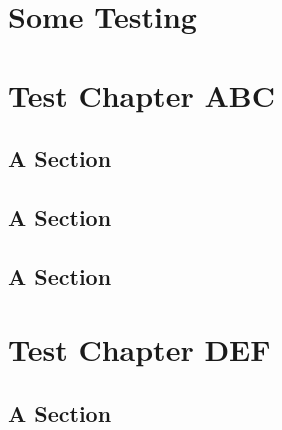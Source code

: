 \documentclass[11pt,paper=b5,footinclude,headinclude]{scrbook} %
\begin{document}
    \tableofcontents

    \chapter{Some Testing}
    \lipsum[1]

    \chapter{Test Chapter ABC}
    \lipsum[1]

    \section{A Section}
    \lipsum[1]

    \section{A Section}
    \lipsum[1]

    \section{A Section}
    \lipsum[1]

    \chapter{Test Chapter DEF}
    \lipsum[1]

    \section{A Section}
    \lipsum[1]
\end{document}

